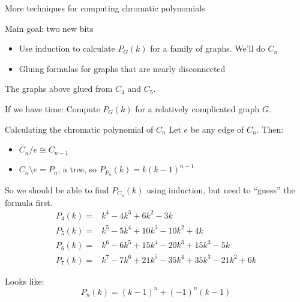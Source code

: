 \documentclass{beamer}
\begin{document}
\begin{frame}{More techniques for computing chromatic polynomials}
  \begin{block}{Main goal: two new bits}
    \begin{itemize}
    \item Use induction to calculate $P_G(k)$ for a family of graphs.
      We'll do $C_n$
    \item Gluing formulas for graphs that are nearly disconnected
 \end{itemize}

    The graphs above glued from $C_4$ and $C_5$.
\end{block}
\begin{block}{If we have time:}
  Compute $P_G(k)$ for a relatively complicated graph $G$.
\end{block}
\end{frame}    



\begin{frame}{Calculating the chromatic polynomial of $C_n$}
  Let $e$ be any edge of $C_n$.  Then:
  \begin{itemize}
  \item $C_n/e \cong C_{n-1}$
  \item $C_n\setminus e=P_n$, a tree, so $P_{P_n}(k)=k(k-1)^{n-1}$
  \end{itemize}

  So we should be able to find $P_{C_n}(k)$ using induction, but need to ``guess'' the formula first.
 \begin{align*}
    P_4(k)= & k^4-4k^3+6k^2-3k \\
P_5(k)= & k^5-5k^4+10k^3-10k^2+4k \\
P_6(k)= & k^6-6k^5+15k^4-20k^3+15k^3-5k \\
P_7(k)= & k^7-7k^6+21k^5-35k^4+35k^3-21k^2+6k
    \end{align*}
\begin{block}{Looks like:}
$$P_n(k)=(k-1)^n+(-1)^n(k-1)$$
  \end{block}
\end{frame}
\end{document}
